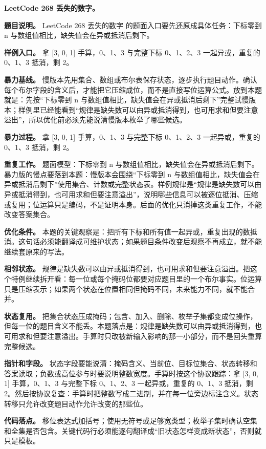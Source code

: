 \noindent\textbf{LeetCode 268 丢失的数字。}

\textbf{题目说明。} LeetCode 268 丢失的数字 的题面入口要先还原成具体任务：下标零到 n 与数组值相比，缺失值会在异或抵消后剩下。

\textbf{样例入口。} 拿 [3, 0, 1] 手算，0、1、3 与完整下标 0、1、2、3 一起异或，重复的 0、1、3 抵消，剩 2。

\textbf{暴力基线。} 慢版本先用集合、数组或布尔表保存状态，逐步执行题目动作。确认每个布尔字段的含义后，才能把它压缩成位，而不是直接写位运算公式。放到本题就是：先按“下标零到 n 与数组值相比，缺失值会在异或抵消后剩下”完整试慢版本；样例里已经能看到“规律是缺失数可以由异或抵消得到，也可用求和但要注意溢出”，所以优化前必须先能说清慢版本枚举了哪些候选。

\textbf{暴力过程。} 拿 [3, 0, 1] 手算，0、1、3 与完整下标 0、1、2、3 一起异或，重复的 0、1、3 抵消，剩 2。

\textbf{重复工作。} 题面模型：下标零到 n 与数组值相比，缺失值会在异或抵消后剩下。暴力版的慢点要落到本题：慢版本会围绕“下标零到 n 与数组值相比，缺失值会在异或抵消后剩下”使用集合、计数或完整状态表。样例规律是“规律是缺失数可以由异或抵消得到，也可用求和但要注意溢出”，说明哪些信息可以被逐位抵消、压缩或复用；位运算只是编码，不是证明本身。后面的优化只消掉这类重复工作，不能改变答案集合。

\textbf{优化条件。} 本题的关键观察是：把所有下标和所有值一起异或，重复出现的数抵消。这句话必须能翻译成可维护状态；如果题目条件改变后观察不再成立，就不能继续套原来的写法。

\textbf{相邻状态。} 规律是缺失数可以由异或抵消得到，也可用求和但要注意溢出。把这个特例继续拆开看：每一位或每个掩码位都要对应题目里的一个布尔事实。位运算只是压缩表示；如果两个状态在位置相同但掩码不同，未来能力不同，就不能合并。

\textbf{状态复用。} 把集合状态压成掩码；包含、加入、删除、枚举子集都变成位操作，但每一位的题目含义不能丢。本题落点是：规律是缺失数可以由异或抵消得到，也可用求和但要注意溢出。手算时只改被新输入影响的那一小部分，而不是回头重算完整候选。

\textbf{指针和字段。} 状态字段要能说清：掩码含义、当前位、目标位集合、状态转移和答案读取；负数或高位参与时要说明整数宽度。手算时按这个协议跟踪：拿 [3, 0, 1] 手算，0、1、3 与完整下标 0、1、2、3 一起异或，重复的 0、1、3 抵消，剩 2。然后按协议复查：手算时把整数写成二进制，并在每一位旁边标注含义。状态转移只允许改变题目动作允许改变的那些位。

\textbf{代码落点。} 移位表达式加括号；使用无符号或足够宽类型；枚举子集时确认空集和全集是否包含。关键代码行必须能逐句翻译成“旧状态怎样变成新状态”，否则就只是模板。

